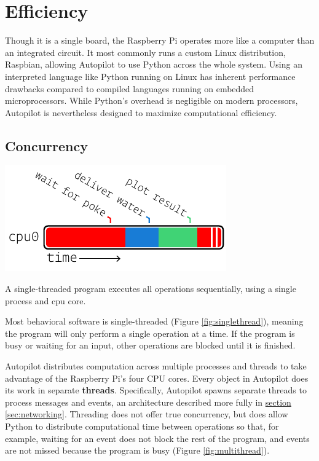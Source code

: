 \section{Efficiency}
\label{sec:efficiency}

Though it is a single board, the Raspberry Pi operates more like a computer than an integrated circuit. It most commonly runs a custom Linux distribution, Raspbian, allowing Autopilot to use Python across the whole system. Using an interpreted language like Python running on Linux has inherent performance drawbacks compared to compiled languages running on embedded microprocessors. While Python's overhead is negligible on modern processors, Autopilot is nevertheless designed to maximize computational efficiency.

\subsection{Concurrency}

\begin{marginfigure}[3.5cm]
\includegraphics[]{figures/side_12_onethread.pdf}
\caption{A single-threaded program executes all operations sequentially, using a single process and cpu core.}
\label{fig:singlethread}
\end{marginfigure}

Most behavioral software is single-threaded (Figure \ref{fig:singlethread}), meaning the program will only perform a single operation at a time. If the program is busy or waiting for an input, other operations are blocked until it is finished.

Autopilot distributes computation across multiple processes and threads to take advantage of the Raspberry Pi's four CPU cores. Every object in Autopilot does its work in separate \textbf{threads}. Specifically, Autopilot spawns separate threads to process messages and events, an architecture described more fully in \hyperref[sec:networking]{section \ref*{sec:networking}}. Threading does not offer true concurrency, but does allow Python to distribute computational time between operations so that, for example, waiting for an event does not block the rest of the program, and events are not missed because the program is busy (Figure \ref{fig:multithread}).

